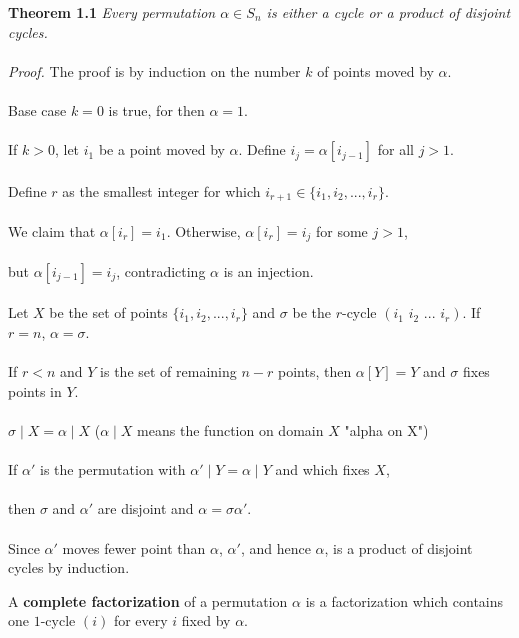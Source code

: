 \documentclass{article}
\begin{document}
\begin{redrules}\color{red}
\textbf{Theorem 1.1} \textit{Every permutation \(\alpha\in S_n\) is either a cycle or a product of disjoint cycles.}\\\\\color{black}
\textit{Proof.} The proof is by induction on the number \(k\) of points moved by \(\alpha\).\\\\
Base case \(k=0\) is true, for then \(\alpha=1\).\\\\
If \(k>0\), let \(i_1\) be a point moved by \(\alpha\). Define \(i_j=\alpha[i_{j-1}]\) for all \(j>1\).\\\\
Define \(r\) as the smallest integer for which \(i_{r+1}\in\{i_1,i_2,...,i_r\}\).\\\\
\null\qquad We claim that \(\alpha[i_r]=i_1\). Otherwise, \(\alpha[i_r]=i_j\) for some \(j>1\),\\\\
\null\qquad but \(\alpha[i_{j-1}]=i_j\), contradicting \(\alpha\) is an injection.\\\\
Let \(X\) be the set of points \(\{i_1,i_2,...,i_r\}\) and \(\sigma\) be the \(r\)-cycle \((i_1\,\,i_2\,\,...\,\,i_r)\). If \(r=n\), \(\alpha=\sigma\).\\\\
If \(r<n\) and \(Y\) is the set of remaining \(n-r\) points, then \(\alpha[Y]=Y\) and \(\sigma\) fixes points in \(Y\).\\\\
\(\sigma\mid X = \alpha\mid X\) (\(\alpha\mid X\) means the function on domain \(X\) "alpha on X")\\\\
If \(\alpha'\) is the permutation with \(\alpha'\mid Y=\alpha\mid Y\) and which fixes \(X\),\\\\
\null\qquad then \(\sigma\) and \(\alpha'\) are disjoint and \(\alpha=\sigma\alpha'\).\\\\
Since \(\alpha'\) moves fewer point than \(\alpha\), \(\alpha'\), and hence \(\alpha\), is a product of disjoint cycles by induction.
\end{redrules}
A \textbf{complete factorization} of a permutation \(\alpha\) is a factorization which contains one \(1\)-cycle \((i)\) for every \(i\) fixed by \(\alpha\).
\end{document}
